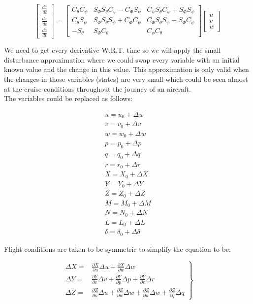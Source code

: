 \documentclass[10pt]{article}
\begin{document}
$$
\left[\begin{array}{l}
\frac{d x}{d t} \\
\frac{d x}{d t} \\
\frac{d z}{d t}
\end{array}\right]=\left[\begin{array}{ccc}
C_{\theta} C_{\psi} & S_{\Phi} S_{\theta} C_{\psi}-C_{\Phi} S_{\psi} & C_{\psi} S_{\theta} C_{\psi}+S_{\Phi} S_{\psi} \\
C_{\theta} S_{\psi} & S_{\Phi} S_{\theta} S_{\psi}+C_{\Phi} C_{\psi} & C_{\Phi} S_{\theta} S_{\psi}-S_{\Phi} C_{\psi} \\
-S_{\theta} & S_{\Phi} C_{\theta} & C_{\phi} C_{\theta}
\end{array}\right]\left[\begin{array}{c}
u \\
v \\
w
\end{array}\right]
$$

We need to get every derivative W.R.T. time so we will apply the small disturbance approximation where we could swap every variable with an initial known value and the change in this value. This approximation is only valid when the changes in those variables (states) are very small which could be seen almost at the cruise conditions throughout the journey of an aircraft.\\
The variables could be replaced as follows:

$$
\begin{gathered}
u=u_{0}+\Delta u \\
v=v_{0}+\Delta v \\
w=w_{0}+\Delta w \\
p=p_{0}+\Delta p \\
q=q_{0}+\Delta q \\
r=r_{0}+\Delta r \\
X=X_{0}+\Delta X \\
Y=Y_{0}+\Delta Y \\
Z=Z_{0}+\Delta Z \\
M=M_{0}+\Delta M \\
N=N_{0}+\Delta N \\
L=L_{0}+\Delta L \\
\delta=\delta_{0}+\Delta \delta
\end{gathered}
$$

Flight conditions are taken to be symmetric to simplify the equation to be:

$$
\left.\begin{array}{cc}
\Delta X= & \frac{\partial X}{\partial u} \Delta u+\frac{\partial X}{\partial w} \Delta w \\
\Delta Y= & \frac{\partial Y}{\partial v} \Delta v+\frac{\partial Y}{\partial p} \Delta p+\frac{\partial Y}{\partial r} \Delta r \\
\Delta Z= & \frac{\partial Z}{\partial u} \Delta u+\frac{\partial Z}{\partial w} \Delta w+\frac{\partial Z}{\partial \dot{w}} \Delta \dot{w}+\frac{\partial Z}{\partial q} \Delta q
\end{array}\right\}
$$
\end{document}
